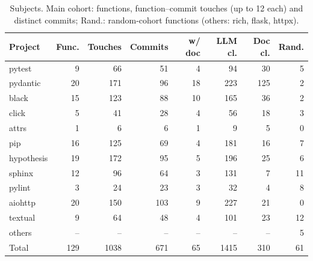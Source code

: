 \begin{table}[t]
\centering
\caption{Subjects. Main cohort: functions, function--commit touches (up to 12 each) and distinct commits; Rand.: random-cohort functions (others: rich, flask, httpx).}
\label{tab:dataset}
\footnotesize
\setlength{\tabcolsep}{2.6pt}
\begin{tabular}{@{}lrrrrrrr@{}}
\toprule
Project & Func. & Touches & Commits & w/ doc & LLM cl. & Doc cl. & Rand. \\
\midrule
pytest & 9 & 66 & 51 & 4 & 94 & 30 & 5 \\
pydantic & 20 & 171 & 96 & 18 & 223 & 125 & 2 \\
black & 15 & 123 & 88 & 10 & 165 & 36 & 2 \\
click & 5 & 41 & 28 & 4 & 56 & 18 & 3 \\
attrs & 1 & 6 & 6 & 1 & 9 & 5 & 0 \\
pip & 16 & 125 & 69 & 4 & 181 & 16 & 7 \\
hypothesis & 19 & 172 & 95 & 5 & 196 & 25 & 6 \\
sphinx & 12 & 96 & 64 & 3 & 131 & 7 & 11 \\
pylint & 3 & 24 & 23 & 3 & 32 & 4 & 8 \\
aiohttp & 20 & 150 & 103 & 9 & 227 & 21 & 0 \\
textual & 9 & 64 & 48 & 4 & 101 & 23 & 12 \\
others & -- & -- & -- & -- & -- & -- & 5 \\
\midrule
Total & 129 & 1038 & 671 & 65 & 1415 & 310 & 61 \\
\bottomrule
\end{tabular}
\end{table}

